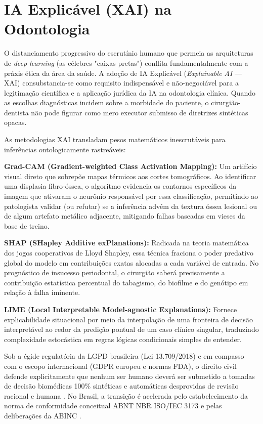 \section{IA Explicável (XAI) na Odontologia}
\label{sec:ia-xai}

O distanciamento progressivo do escrutínio humano que permeia as arquiteturas de \textit{deep learning} (as célebres "caixas pretas") conflita fundamentalmente com a práxis ética da área da saúde. A adoção de IA Explicável (\textit{Explainable AI} --- XAI) consubstancia-se como requisito indispensável e não-negociável para a legitimação científica e a aplicação jurídica da IA na odontologia clínica. Quando as escolhas diagnósticas incidem sobre a morbidade do paciente, o cirurgião-dentista não pode figurar como mero executor submisso de diretrizes sintéticas opacas.

As metodologias XAI transladam pesos matemáticos inescrutáveis para inferências ontologicamente rastreáveis:

\textbf{Grad-CAM (Gradient-weighted Class Activation Mapping):} Um artifício visual direto que sobrepõe mapas térmicos aos cortes tomográficos. Ao identificar uma displasia fibro-óssea, o algoritmo evidencia os contornos específicos da imagem que ativaram o neurônio responsável por essa classificação, permitindo ao patologista validar (ou refutar) se a inferência advém da textura óssea lesional ou de algum artefato metálico adjacente, mitigando falhas baseadas em vieses da base de treino.

\textbf{SHAP (SHapley Additive exPlanations):} Radicada na teoria matemática dos jogos cooperativos de Lloyd Shapley, essa técnica fraciona o poder predativo global do modelo em contribuições exatas alocadas a cada variável de entrada. No prognóstico de insucesso periodontal, o cirurgião saberá precisamente a contribuição estatística percentual do tabagismo, do biofilme e do genótipo em relação à falha iminente.

\textbf{LIME (Local Interpretable Model-agnostic Explanations):} Fornece explicabilidade situacional por meio da interpolação de uma fronteira de decisão interpretável ao redor da predição pontual de um caso clínico singular, traduzindo complexidade estocástica em regras lógicas condicionais simples de entender.

Sob a égide regulatória da LGPD brasileira (Lei 13.709/2018) e em compasso com o escopo internacional (GDPR europeu e normas FDA), o direito civil defende explicitamente que nenhum ser humano deverá ser submetido a tomadas de decisão biomédicas 100\% sintéticas e automáticas desprovidas de revisão racional e humana \cite{aisociety2026}. No Brasil, a transição é acelerada pelo estabelecimento da norma de conformidade conceitual ABNT NBR ISO/IEC 3173 e pelas deliberações da ABINC \cite{khoshfekr2025}.

